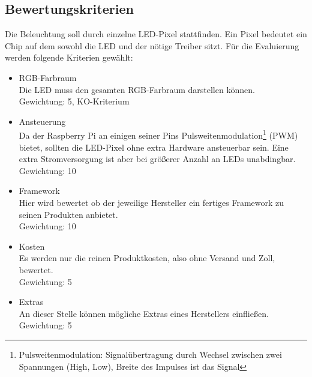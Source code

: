 
\subsection{Bewertungskriterien}
Die Beleuchtung soll durch einzelne LED-Pixel stattfinden. Ein Pixel bedeutet ein Chip auf dem sowohl die LED und der nötige Treiber sitzt. Für die Evaluierung werden folgende Kriterien gewählt:
\begin{itemize}
\item RGB-Farbraum \\
Die LED muss den gesamten RGB-Farbraum darstellen können. \\
Gewichtung: 5, KO-Kriterium
\item Ansteuerung \\
Da der Raspberry Pi an einigen seiner Pins Pulsweitenmodulation\footnote{Pulsweitenmodulation: Signalübertragung durch Wechsel zwischen zwei Spannungen (High, Low), Breite des Impulses ist das Signal} (PWM) bietet, sollten die LED-Pixel ohne extra Hardware ansteuerbar sein. Eine extra Stromversorgung ist aber bei größerer Anzahl an LEDs unabdingbar. \\
Gewichtung: 10
\item Framework \\
Hier wird bewertet ob der jeweilige Hersteller ein fertiges Framework zu seinen Produkten anbietet. \\
Gewichtung: 10
\item Kosten \\
Es werden nur die reinen Produktkosten, also ohne Versand und Zoll, bewertet. \\
Gewichtung: 5
\item Extras \\
An dieser Stelle können mögliche Extras eines Herstellers einfließen. \\
Gewichtung: 5
\end{itemize}


